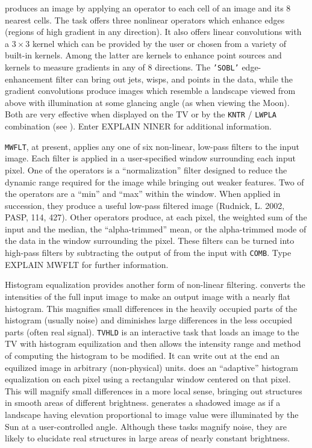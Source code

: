      {\tt {}} produces an image by applying an operator to
each cell of an image and its 8 nearest cells.  The task offers three
nonlinear operators which enhance edges (regions of high gradient in
any direction). It also offers linear convolutions with a $3\times3$
kernel which can be provided by the user or chosen from a variety of
built-in kernels.  Among the latter are kernels to enhance point
sources and kernels to measure gradients in any of 8 directions.  The
{\tt 'SOBL'} edge-enhancement filter can bring out jets, wisps, and
points in the data, while the gradient convolutions produce images
which resemble a landscape viewed from above with illumination at some
glancing angle (as when viewing the Moon).  Both are very effective
when displayed on the TV or by the {\tt KNTR} / {\tt LWPLA}
combination (see ).  Enter {\us EXPLAIN NINER \CR} for
additional information.

     {\tt MWFLT}, at present, applies any one of six non-linear,
low-pass filters to the input image.  Each filter is applied in a
user-specified window surrounding each input pixel.  One of the
operators is a ``normalization'' filter designed to reduce the dynamic
range required for the image while bringing out weaker features.  Two
of the operators are a ``min'' and ``max'' within the window.  When
applied in succession, they produce a useful low-pass filtered image
(Rudnick, L. 2002, PASP, 114, 427).  Other operators produce, at each
pixel, the weighted sum of the input and the median, the
``alpha-trimmed'' mean, or the alpha-trimmed mode of the data in the
window surrounding the pixel.  These filters can be turned into
high-pass filters by subtracting the output of {\tt {}} from
the input with \hbox{{\tt COMB}}. Type {\us EXPLAIN MWFLT \CR} for
further information.

     Histogram equalization provides another form of non-linear
filtering.  {\tt {}} converts the intensities of the full
input image to make an output image with a nearly flat histogram.
This magnifies small differences in the heavily occupied parts of the
histogram (usually noise) and diminishes large differences in the less
occupied parts (often real signal).  {\tt TVHLD} is an interactive
task that loads an image to the TV with histogram equilization and
then allows the intensity range and method of computing the histogram
to be modified.  It can write out at the end an equilized image in
arbitrary (non-physical) units.  {\tt {}} does an
``adaptive'' histogram equalization on each pixel using a rectangular
window centered on that pixel.  This will magnify small differences in
a more local sense, bringing out structures in smooth areas of
different brightness.  {\tt {}} generates a shadowed image
as if a landscape having elevation proportional to image value were
illuminated by the Sun at a user-controlled angle.  Although these
tasks magnify noise, they are likely to elucidate real structures in
large areas of nearly constant brightness.

